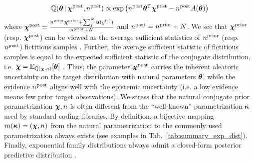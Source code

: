 %
\begin{equation}\label{eq:posterior}
    \operatorname{\mathbb{Q}}(\bm{\theta} \,|\, \bm{\chi}^\text{post}, n^\text{post}) \propto \exp\left( n^\text{post} \bm{\theta}^T\bm{\chi}^\text{post} - n^\text{post} A(\bm{\theta}) \right)
\end{equation}
%
where $\bm{\chi}^\text{post}=\frac{n^\text{prior} \bm{\chi}^\text{prior}+ \sum_{j}^N{\bm{u}(y^{(j)})}}{n^\text{prior} + N}$ and $n^\text{post}=n^\text{prior} + N$. We see that $\bm{\chi}^{\text{prior}}$ (resp. $\bm{\chi}^{\text{post}}$) can be viewed as the average sufficient statistics of $n^{\text{prior}}$ (resp. $n^{\text{post}}$) fictitious samples \citep{bishop}. 
Further, the average sufficient statistic of fictitious samples is equal to the expected sufficient statistic of the conjugate distribution, i.e. $\bm{\chi} = \operatorname{\mathbb{E}}_{\operatorname{\mathbb{Q}}(\bm{\chi}, n)}[\bm{\theta}]$ \citep{exponential-family-stats, conjugate-prior-exponential-family}. Thus, the parameter $\bm{\chi}^\text{post}$ carries the inherent aleatoric uncertainty on the target distribution with natural parameters $\bm{\theta}$, while the evidence $n^\text{post}$ aligns well with the epistemic uncertainty (i.e. a low evidence means few prior target observations). We stress that the natural conjugate prior parametrization $\bm{\chi}, n$ is often different from the ``well-known'' parametrization $\bm{\kappa}$ used by standard coding libraries. By definition, a bijective mapping $m(\bm{\kappa}) = (\bm{\chi}, n)$ from the natural parametrization to the commonly used parametrization always exists (see examples in Tab.~\ref{tab:summary_exp_dist}). Finally, exponential family distributions always admit a closed-form posterior predictive distribution \citep{bayesian-data-analysis}.

